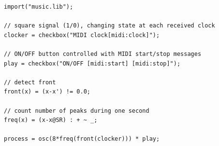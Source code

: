 \begin{lstlisting}
import("music.lib");

// square signal (1/0), changing state at each received clock
clocker = checkbox("MIDI clock[midi:clock]");    

// ON/OFF button controlled with MIDI start/stop messages
play = checkbox("ON/OFF [midi:start] [midi:stop]");    

// detect front
front(x) = (x-x') != 0.0;      

// count number of peaks during one second
freq(x) = (x-x@SR) : + ~ _;   
   
process = osc(8*freq(front(clocker))) * play;
\end{lstlisting}




